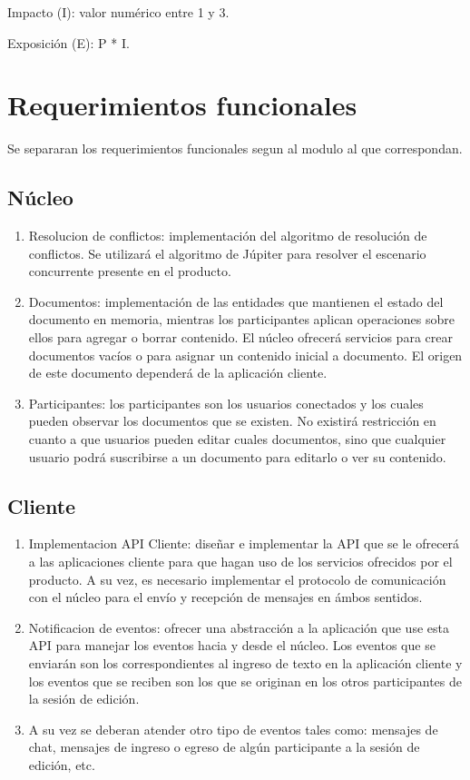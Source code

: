 \documentclass[12pt,a4paper]{article}
\begin{document}
Impacto (I): valor numérico entre 1 y 3.

Exposición (E): P * I.

	\section{Requerimientos funcionales}
	
	Se separaran los requerimientos funcionales segun al modulo al que correspondan.

	\subsection{Núcleo}
	\begin{enumerate}
	\item Resolucion de conflictos: implementación del algoritmo de resolución de conflictos. Se utilizará el algoritmo de Júpiter \cite{jupiter} para resolver el escenario concurrente presente en el producto.
	\item Documentos: implementación de las entidades que mantienen el estado del documento en memoria, mientras los participantes aplican operaciones sobre ellos para agregar o borrar contenido. El núcleo ofrecerá servicios para crear documentos vacíos o para asignar un contenido inicial a documento. El origen de este documento dependerá de la aplicación cliente.
	\item Participantes: los participantes son los usuarios conectados y los cuales pueden observar los documentos que se existen. No existirá restricción en cuanto a que usuarios pueden editar cuales documentos, sino que cualquier usuario podrá suscribirse a un documento para editarlo o ver su contenido.
	
	\end{enumerate}


	\subsection{Cliente}

	\begin{enumerate}
\item Implementacion API Cliente: diseñar e implementar la API que se le ofrecerá a las aplicaciones cliente para que hagan uso de los servicios ofrecidos por el producto.
A su vez, es necesario implementar el protocolo de comunicación con el núcleo para el envío y recepción de mensajes en ámbos sentidos.

\item Notificacion de eventos: ofrecer una abstracción a la aplicación que use esta API para manejar los eventos hacia y desde el núcleo. Los eventos que se enviarán son los correspondientes al ingreso de texto en la aplicación cliente y los eventos que se reciben son los que se originan en los otros participantes de la sesión de edición.

\item A su vez se deberan atender otro tipo de eventos tales como: mensajes de chat, mensajes de ingreso o egreso de algún participante a la sesión de edición, etc.
	\end{enumerate}
\end{document}
